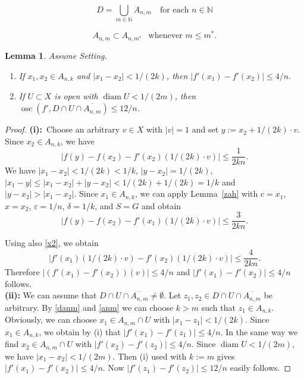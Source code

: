 \documentclass[10pt,a4paper]{amsart}
\newtheorem{lemma}{Lemma}
\newcommand{\N}{{\mathbb N}}
\newcommand{\diam}{\operatorname{diam}}
\newcommand{\ep}{\varepsilon}
\newcommand{\osc}{\operatorname{osc}}
\begin{document}
\begin{equation}\label{danm}
D= \bigcup_{m\in \N} A_{n,m}\ \ \ \text{ for each } n\in \N
\end{equation}

\begin{equation}\label{anm}
A_{n,m} \subset A_{n,m^*}\ \ \text{ whenever } m \leq m^*.
\end{equation}

\begin{lemma}\label{osc}
Assume Setting.
\begin{enumerate}
\item[(i)]
If  $x_1, x_2 \in A_{n,k}$ and  $|x_1-x_2|< 1/(2k)$, 
then $|f'(x_1)-f'(x_2)|\leq 4/n$.
\item[(ii)]
If $U\subset X$ is open with $\diam U< 1/(2m)$, then  
$\osc(f', D \cap U\cap \overline{A_{n,m}})  \leq 12/n$.
\end{enumerate}
\end{lemma}

\begin{proof}
{\bf (i):}\ 
Choose an arbitrary $v\in X$ with $|v|=1$ and set $y:= x_2 + 1/(2k) \cdot v$. Since  $x_2 \in A_{n,k}$,
 we have
\begin{equation}\label{x2}
|f(y)-f(x_2) - f'(x_2) ( 1/(2k) \cdot v )| \leq \frac{1}{2kn}. 
\end{equation}
  We have $|x_1-x_2|< 1/ (2k)< 1/k$,  $|y-x_2|=  1/ (2k)$, $|x_1-y| \leq |x_1-x_2| + |y-x_2|
< 1/ (2k) + 1/ (2k) = 1/k$ and $|y-x_2| > |x_1-x_2|$. Since $x_1 \in A_{n,k}$,  we  can apply
  Lemma~\ref{zah}  with $c= x_1$, $x= x_2$, $\ep=1/n$, 
$\delta= 1/k$, and $S=G$ and obtain
$$
|f(y)-f(x_2) - f'(x_1) (1/(2k) \cdot  v)| \leq  \frac{3}{2kn}.
$$

Using also \eqref{x2}, we
	 obtain 
$$
|f'(x_1) (1/(2k) \cdot v) - f'(x_2) (1/(2k)\cdot v)| \leq \frac{4}{2kn}.
$$ 
Therefore
	$|(f'(x_1)- f'(x_2)) (v)|\leq  4/n$  and $|f'(x_1)- f'(x_2)|\leq 4/n$ follows. \\
{\bf (ii):} We can assume that $D \cap U \cap \overline{A_{n,m}} \neq \emptyset$. Let 
	 $z_1, z_2 \in D \cap U \cap \overline{A_{n,m}}$ be arbitrary.    By \eqref{danm} and \eqref{anm} we can choose  $k>m$ such that $z_1\in A_{n,k}$. Obviously,
	 we can choose $x_1 \in A_{n,m} \cap U$ with $|x_1-z_1|< 1/(2k)$. Since $x_1 \in  A_{n,k}$, we obtain
	 by (i) that $|f'(x_1)-f'(z_1)| \leq 4/n$. In the same way we  find $x_2 \in A_{n,m} \cap U$
	 with $|f'(x_2)-f'(z_2)| \leq 4/n$. Since  $\diam U < 1/(2m)$, we have $|x_1-x_2|< 1/(2m) $. 
Then  (i) used with $k:=m$ gives $|f'(x_1)- f'(x_2)|\leq 4/n$. Now $|f'(z_1)-f'(z_2)|\leq  12/n$
	 easily follows.
\end{proof}
\end{document}
